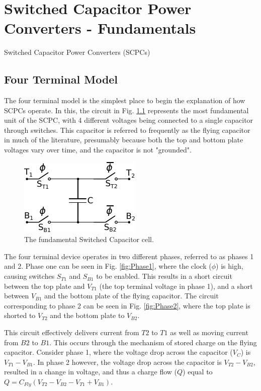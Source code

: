 \chapter{Switched Capacitor Power Converters - Fundamentals}
\label{chap:Fundamentals}
Switched Capacitor Power Converters (SCPCs)
	\section{Four Terminal Model}
	\label{Sec:4TermModel}
	The four terminal model is the simplest place to begin the explanation of how SCPCs operate. In this, the circuit in Fig. \ref{fig:sccell1} represents the most fundamental unit of the SCPC, with 4 different voltages being connected to a single capacitor through switches. This capacitor is referred to frequently as the flying capacitor in much of the literature, presumably because both the top and bottom plate voltages vary over time, and the capacitor is not "grounded". 
	
\begin{figure}
	\centering
	\includegraphics[width=0.4\linewidth]{4Terminal/Figures/SCCell_1.pdf}
	\caption{The fundamental Switched Capacitor cell.}
	\label{fig:sccell1}
\end{figure}
	
	The four terminal device operates in two different phases, referred to as phases 1 and 2. Phase one can be seen in Fig. \ref{fig:Phase1}, where the clock ($\phi$) is high, causing switches $S_{T1}$ and $S_{B1}$ to be enabled. This results in a short circuit between the top plate and $V_{T1}$ (the top terminal voltage in phase 1), and a short between $V_{B1}$ and the bottom plate of the flying capacitor. The circuit corresponding to phase 2 can be seen in Fig. \ref{fig:Phase2}, where the top plate is shorted to $V_{T2}$ and the bottom plate to $V_{B2}$.
	
	This circuit effectively delivers current from ${T2}$ to ${T1}$ as well as moving current from ${B2}$ to ${B1}$. This occurs through the mechanism of stored charge on the flying capacitor. Consider phase 1, where the voltage drop across the capacitor ($V_{C}$) is $V_{T1} - V_{B1}$. In phase 2 however, the voltage drop across the capacitor is $V_{T2} - V_{B2}$, resulted in a change in voltage, and thus a charge flow ($Q$) equal to $Q = C_{Fly}(V_{T2} - V_{B2} - V_{T1} + V_{B1})$.
	
